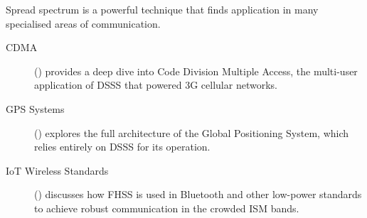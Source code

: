 \begin{importantbox}[title={Further Reading}]
    Spread spectrum is a powerful technique that finds application in many specialised areas of communication.
    \begin{description}
        \item[CDMA] () provides a deep dive into Code Division Multiple Access, the multi-user application of DSSS that powered 3G cellular networks.
        \item[GPS Systems] () explores the full architecture of the Global Positioning System, which relies entirely on DSSS for its operation.
        \item[IoT Wireless Standards] () discusses how FHSS is used in Bluetooth and other low-power standards to achieve robust communication in the crowded ISM bands.
    \end{description}
\end{importantbox}